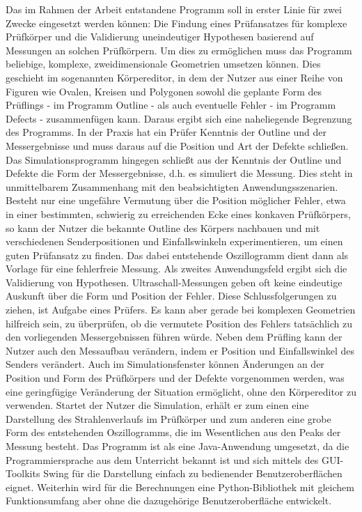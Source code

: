 \documentclass[reducespace,stylepage,semiarbeit]{spezidoc}
\begin{document}
Das im Rahmen der Arbeit entstandene Programm soll in erster Linie für zwei Zwecke eingesetzt werden können: Die Findung eines Prüfansatzes für komplexe Prüfkörper und die Validierung uneindeutiger Hypothesen basierend auf Messungen an solchen Prüfkörpern.
Um dies zu ermöglichen muss das Programm beliebige, komplexe, zweidimensionale Geometrien umsetzen können. 
Dies geschieht im sogenannten Körpereditor, in dem der Nutzer aus einer Reihe von Figuren wie Ovalen, Kreisen und Polygonen sowohl die geplante Form des Prüflings - im Programm Outline - als auch eventuelle Fehler - im Programm Defects - zusammenfügen kann.
Daraus ergibt sich eine naheliegende Begrenzung des Programms. 
In der Praxis hat ein Prüfer Kenntnis der Outline und der Messergebnisse und muss daraus auf die Position und Art der Defekte schließen. 
Das Simulationsprogramm hingegen schließt aus der Kenntnis der Outline und Defekte die Form der Messergebnisse, d.h. 
es simuliert die Messung. 
Dies steht in unmittelbarem Zusammenhang mit den beabsichtigten Anwendungsszenarien.
Besteht nur eine ungefähre Vermutung über die Position möglicher Fehler, etwa in einer bestimmten, schwierig zu erreichenden Ecke eines konkaven Prüfkörpers, %
so kann der Nutzer die bekannte Outline des Körpers nachbauen und mit verschiedenen Senderpositionen und Einfallswinkeln experimentieren, um einen guten Prüfansatz zu finden. 
Das dabei entstehende Oszillogramm dient dann als Vorlage für eine fehlerfreie Messung.
Als zweites Anwendungsfeld ergibt sich die Validierung von Hypothesen. 
Ultraschall-Messungen geben oft keine eindeutige Auskunft über die Form und Position der Fehler. 
Diese Schlussfolgerungen zu ziehen, ist Aufgabe eines Prüfers. 
Es kann aber gerade bei komplexen Geometrien hilfreich sein, zu überprüfen, ob die vermutete Position des Fehlers tatsächlich zu den vorliegenden Messergebnissen führen würde.
Neben dem Prüfling kann der Nutzer auch den Messaufbau verändern, indem er Position und Einfallswinkel des Senders verändert. 
Auch im Simulationsfenster können Änderungen an der Position und Form des Prüfkörpers und der Defekte vorgenommen werden, was eine geringfügige Veränderung der Situation ermöglicht, ohne den Körpereditor zu verwenden.
Startet der Nutzer die Simulation, erhält er zum einen eine Darstellung des Strahlenverlaufs im Prüfkörper und zum anderen eine grobe Form des entstehenden Oszillogramms, die im Wesentlichen aus den Peaks der Messung besteht.
Das Programm ist als eine Java-Anwendung umgesetzt, da die Programmiersprache aus dem Unterricht bekannt ist und sich mittels des GUI-Toolkits Swing für die Darstellung einfach zu bedienender Benutzeroberflächen eignet.
Weiterhin wird für die Berechnungen eine Python-Bibliothek mit gleichem Funktionsumfang aber ohne die dazugehörige Benutzeroberfläche entwickelt.
\end{document}
